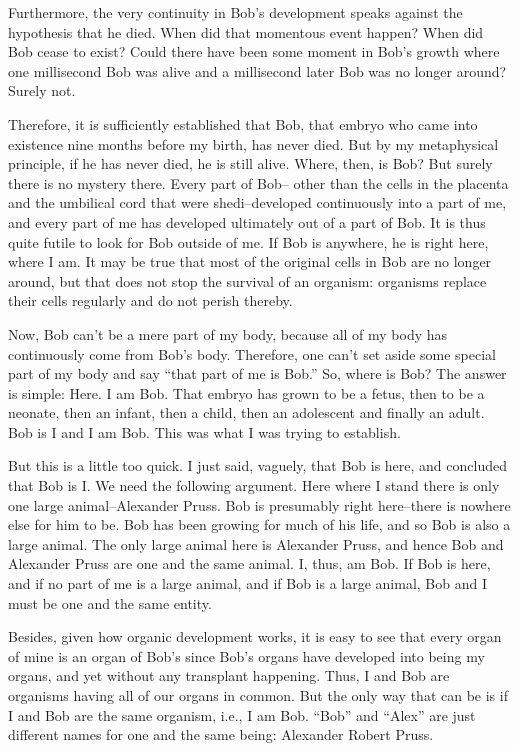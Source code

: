 Furthermore,  the  very  continuity  in  Bob’s  development  speaks 
against  the  hypothesis  that  he  died.    When  did  that  momentous  event 
happen?  When did Bob cease to exist?  Could there have been some 
moment  in  Bob’s  growth  where  one  millisecond  Bob was alive and a 
millisecond later Bob was no longer around?  Surely not. 

Therefore, it is sufficiently established that Bob, that embryo who 
came into existence nine months before my birth, has never died.  But by 
my metaphysical principle, if he has never died, he is still alive.  Where, 
then, is Bob?  But surely there is no mystery there.  Every part of Bob–
other  than  the  cells  in  the  placenta  and  the  umbilical  cord  that  were 
shedi–developed continuously into a part of me, and every part of me has 
developed ultimately out of a part of Bob.  It is thus quite futile to look 
for Bob outside of me.  If Bob is anywhere, he is right here, where I am.  
It may be true that most of the original cells in Bob are no longer around, 
but  that  does  not  stop  the  survival  of  an  organism:  organisms  replace 
their cells regularly and do not perish thereby. 

Now, Bob can’t be a mere part of my body, because all of my body 
has continuously come from Bob’s body.  Therefore, one can’t set aside 
some  special  part  of  my  body  and  say  “that  part  of  me  is  Bob.”    So, 
where is Bob?  The answer is simple: Here.  I am Bob.  That embryo has 
grown to be a fetus, then to be a neonate, then an infant, then a child, 
then an adolescent and finally an adult.  Bob is I and I am Bob.  This was 
what I was trying to establish. 

But this is a little too quick.  I just said, vaguely, that Bob is here, 
and concluded that Bob is I.  We need the following argument.  Here 
where I stand there is only one large animal–Alexander Pruss.  Bob is 
presumably right here–there is nowhere else for him to be.  Bob has been 
growing for much of his life, and so Bob is also a large animal.  The only 
large  animal  here  is  Alexander  Pruss,  and  hence  Bob  and  Alexander 
Pruss are one and the same animal.  I, thus, am Bob.  If Bob is here, and 
if no part of me is a large animal, and if Bob is a large animal, Bob and I 
must be one and the same entity.   
 
Besides, given how organic development works, it is easy to see that 
every  organ  of  mine  is  an  organ  of  Bob’s  since  Bob’s  organs  have 
developed into being my organs, and yet without any transplant 
happening.  Thus, I and Bob are organisms having all of our organs in 
common.    But  the  only  way  that  can  be  is  if  I  and  Bob  are  the  same 
organism, i.e., I am Bob.  “Bob” and “Alex” are just different names for 
one and the same being: Alexander Robert Pruss. 

